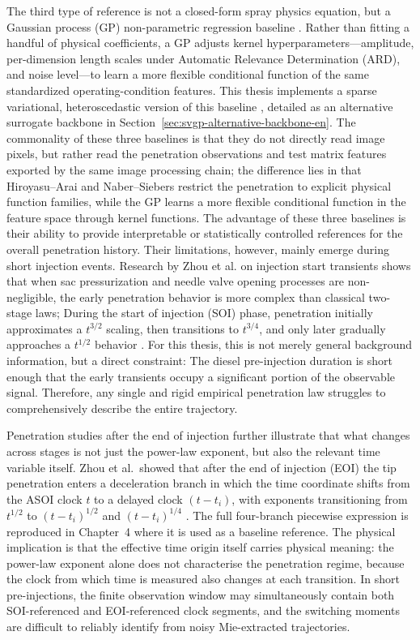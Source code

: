 The third type of reference is not a closed-form spray physics equation, but a Gaussian process (GP) non-parametric regression baseline \cite{RasmussenWilliams2006}. Rather than fitting a handful of physical coefficients, a GP adjusts kernel hyperparameters---amplitude, per-dimension length scales under Automatic Relevance Determination (ARD), and noise level---to learn a more flexible conditional function of the same standardized operating-condition features. This thesis implements a sparse variational, heteroscedastic version of this baseline \cite{HensmanFusiLawrence2013}, detailed as an alternative surrogate backbone in Section~\ref{sec:svgp-alternative-backbone-en}.
The commonality of these three baselines is that they do not directly read image pixels, but rather read the penetration observations and test matrix features exported by the same image processing chain; the difference lies in that Hiroyasu--Arai and Naber--Siebers restrict the penetration to explicit physical function families, while the GP learns a more flexible conditional function in the feature space through kernel functions.
The advantage of these three baselines is their ability to provide interpretable or statistically controlled references for the overall penetration history.
Their limitations, however, mainly emerge during short injection events.
Research by Zhou et al. on injection start transients shows that when sac pressurization and needle valve opening processes are non-negligible, the early penetration behavior is more complex than classical two-stage laws;
During the start of injection (SOI) phase, penetration initially approximates a \(t^{3/2}\) scaling, then transitions to \(t^{3/4}\), and only later gradually approaches a \(t^{1/2}\) behavior \cite{ZhouLiYi2021}.
For this thesis, this is not merely general background information, but a direct constraint:
The diesel pre-injection duration is short enough that the early transients occupy a significant portion of the observable signal.
Therefore, any single and rigid empirical penetration law struggles to comprehensively describe the entire trajectory.

Penetration studies after the end of injection further illustrate that what changes across stages is not just the power-law exponent, but also the relevant time variable itself.
Zhou et al.\ showed that after the end of injection (EOI) the tip penetration enters a deceleration branch in which the time coordinate shifts from the ASOI clock $t$ to a delayed clock $(t-t_i)$, with exponents transitioning from $t^{1/2}$ to $(t-t_i)^{1/2}$ and $(t-t_i)^{1/4}$ \cite{ZhouLiLaiWei2019}.
The full four-branch piecewise expression is reproduced in Chapter~4 where it is used as a baseline reference.
The physical implication is that the effective time origin itself carries physical meaning: the power-law exponent alone does not characterise the penetration regime, because the clock from which time is measured also changes at each transition.
In short pre-injections, the finite observation window may simultaneously contain both SOI-referenced and EOI-referenced clock segments, and the switching moments are difficult to reliably identify from noisy Mie-extracted trajectories.

